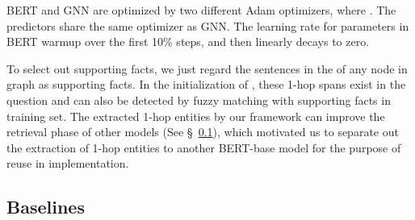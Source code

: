 BERT and GNN are optimized by two different Adam optimizers, where . The predictors share the same optimizer as GNN. The learning rate for parameters in BERT warmup over the first 10\% steps, and then linearly decays to zero.

To select out supporting facts, we just regard the sentences in the  of any node in graph as supporting facts. 
In the initialization of , these 1-hop spans exist in the question and can also be detected by fuzzy matching with supporting facts in training set. The extracted 1-hop entities by our framework can improve the retrieval phase of other models (See \S~\ref{sec:baseline}), which motivated us to separate out the extraction of 1-hop entities to another BERT-base model for the purpose of reuse in implementation.
\subsection{Baselines}\label{sec:baseline}
